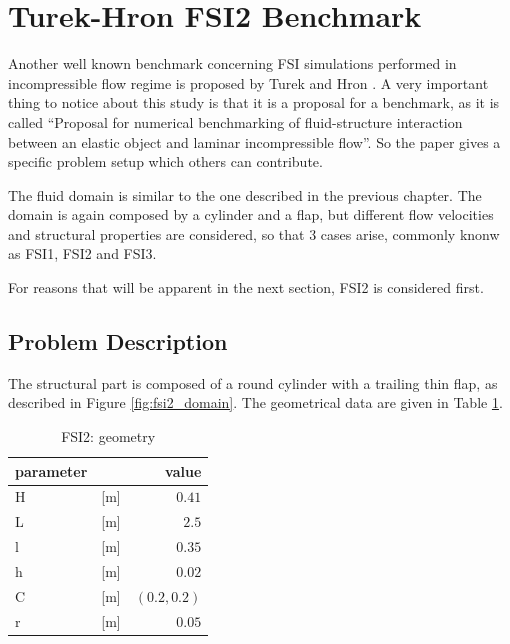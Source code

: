 \newpage

\section{Turek-Hron FSI2 Benchmark}
\label{sec:FSI2}


Another well known benchmark concerning FSI simulations performed in incompressible flow regime is proposed by Turek and Hron \cite{turek2006proposal}.
A very important thing to notice about this study is that it is a proposal for a benchmark, as it is called  ``Proposal for numerical benchmarking of fluid-structure interaction between an elastic object and laminar incompressible flow''. So the paper gives a specific problem setup which others can contribute.

The fluid domain is similar to the one described in the previous chapter. The domain is again composed by a cylinder and a flap, but different flow velocities and structural properties are considered, so that 3 cases arise, commonly knonw as FSI1, FSI2 and FSI3.

For reasons that will be apparent in the next section, FSI2 is considered first. 

\subsection{Problem Description}

The structural part is composed of a round cylinder with a trailing thin flap, as described in Figure \ref{fig:fsi2_domain}. The geometrical data are given in Table \ref{table:fsi2-geom}.

\begin{table}[!htb]
	\begin{center}
		\begin{tabular}{ l c | r } 
			parameter & & value   \\ 
			\hline
			H  & [\si{m}] & $0.41$     \\
			L &  [\si{m}] & $2.5$  \\
			l  & [\si{m}] & $0.35$  \\
			h  & [\si{m}] & $0.02$  \\
			C  & [\si{m}] & $\left(0.2,0.2 \right)$  \\
			r  & [\si{m}] & $0.05$  \\
		\end{tabular}
	\end{center}
	\caption{FSI2: geometry}
	\label{table:fsi2-geom}
\end{table}


